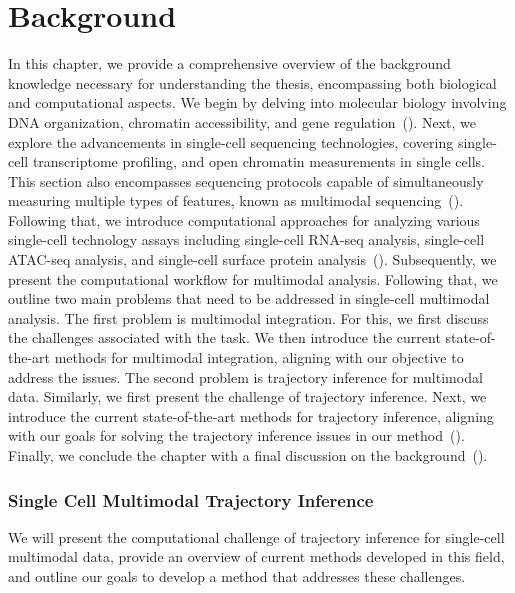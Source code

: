 %
%
\chapter{Background}
\label{cha:background}
\graphicspath{{chapter2/figs/}}

In this chapter, we provide a comprehensive overview of the background knowledge necessary for understanding the thesis, encompassing both biological and computational aspects. We begin by delving into molecular biology involving DNA organization, chromatin accessibility, and gene regulation~(). Next, we explore the advancements in single-cell sequencing technologies, covering single-cell transcriptome profiling, and open chromatin measurements in single cells. This section also encompasses sequencing protocols capable of simultaneously measuring multiple types of features, known as multimodal sequencing~(). Following that, we introduce computational approaches for analyzing various single-cell technology assays including single-cell RNA-seq analysis, single-cell ATAC-seq analysis, and single-cell surface protein analysis~(). Subsequently, we present the computational workflow for multimodal analysis. Following that, we outline two main problems that need to be addressed in single-cell multimodal analysis. The first problem is multimodal integration. For this, we first discuss the challenges associated with the task. We then introduce the current state-of-the-art methods for multimodal integration, aligning with our objective to address the issues. The second problem is trajectory inference for multimodal data. Similarly, we first present the challenge of trajectory inference. Next, we introduce the current state-of-the-art methods for trajectory inference, aligning with our goals for solving the trajectory inference issues in our method~(). Finally, we conclude the chapter with a final discussion on the background~().




\subsection{Single Cell Multimodal Trajectory Inference}
We will present the computational challenge of trajectory inference for single-cell multimodal data, provide an overview of current methods developed in this field, and outline our goals to develop a method that addresses these challenges.

